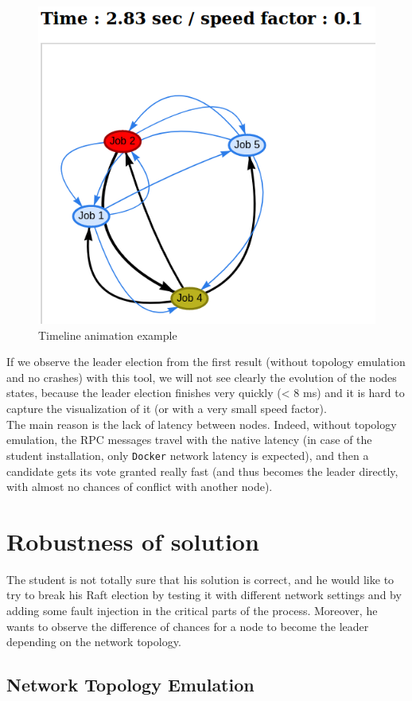 \documentclass{eplmastersthesis}
\begin{document}
      \begin{figure}[H]
        \centering
        \includegraphics[width=0.4\linewidth]{figures/user_case/anim_pres.png}
        \caption{Timeline animation example}
        \label{fig:timeline}
      \end{figure}

      If we observe the leader election from the first result (without
      topology emulation and no crashes) with this tool, we will not see clearly
      the evolution of the nodes states, because the leader election finishes
      very quickly (< 8 ms) and it is hard to capture the visualization of it
      (or with a very small speed factor).\\
      The main reason is the lack of latency between nodes. Indeed, without
      topology emulation, the RPC messages travel with the native latency
      (in case of the student installation, only \texttt{Docker} network latency is
      expected), and then a candidate gets its vote granted really fast (and
      thus becomes the leader directly, with almost no chances of conflict
      with another node).

    \section{Robustness of solution}

      The student is not totally sure that his solution is correct, and he would
      like to try to break his Raft election by testing it with different
      network settings and by adding some fault injection in the critical
      parts of the process. Moreover, he wants to observe the difference of
      chances for a node to become the leader depending on the network topology.

      \subsection{Network Topology Emulation}
\end{document}
